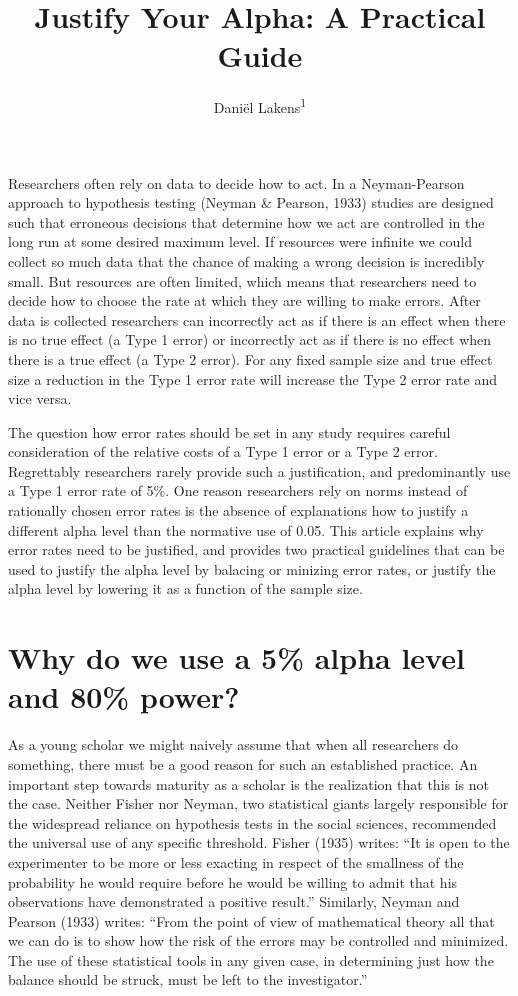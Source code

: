\documentclass[,jou,floatsintext]{apa6}
\title{Justify Your Alpha: A Practical Guide}
\author{Daniël Lakens\textsuperscript{1}}
\date{}
\affiliation{
\vspace{0.5cm}
\textsuperscript{1} Eindhoven University of Technology, The Netherlands}
\begin{document}
\maketitle

Researchers often rely on data to decide how to act. In a Neyman-Pearson approach to hypothesis testing (Neyman \& Pearson, 1933) studies are designed such that erroneous decisions that determine how we act are controlled in the long run at some desired maximum level. If resources were infinite we could collect so much data that the chance of making a wrong decision is incredibly small. But resources are often limited, which means that researchers need to decide how to choose the rate at which they are willing to make errors. After data is collected researchers can incorrectly act as if there is an effect when there is no true effect (a Type 1 error) or incorrectly act as if there is no effect when there is a true effect (a Type 2 error). For any fixed sample size and true effect size a reduction in the Type 1 error rate will increase the Type 2 error rate and vice versa.

The question how error rates should be set in any study requires careful consideration of the relative costs of a Type 1 error or a Type 2 error. Regrettably researchers rarely provide such a justification, and predominantly use a Type 1 error rate of 5\%. One reason researchers rely on norms instead of rationally chosen error rates is the absence of explanations how to justify a different alpha level than the normative use of 0.05. This article explains why error rates need to be justified, and provides two practical guidelines that can be used to justify the alpha level by balacing or minizing error rates, or justify the alpha level by lowering it as a function of the sample size.

\hypertarget{why-do-we-use-a-5-alpha-level-and-80-power}{%
\section{Why do we use a 5\% alpha level and 80\% power?}\label{why-do-we-use-a-5-alpha-level-and-80-power}}

As a young scholar we might naively assume that when all researchers do something, there must be a good reason for such an established practice. An important step towards maturity as a scholar is the realization that this is not the case. Neither Fisher nor Neyman, two statistical giants largely responsible for the widespread reliance on hypothesis tests in the social sciences, recommended the universal use of any specific threshold. Fisher (1935) writes: \enquote{It is open to the experimenter to be more or less exacting in respect of the smallness of the probability he would require before he would be willing to admit that his observations have demonstrated a positive result.} Similarly, Neyman and Pearson (1933) writes: \enquote{From the point of view of mathematical theory all that we can do is to show how the risk of the errors may be controlled and minimized. The use of these statistical tools in any given case, in determining just how the balance should be struck, must be left to the investigator.}
\end{document}
